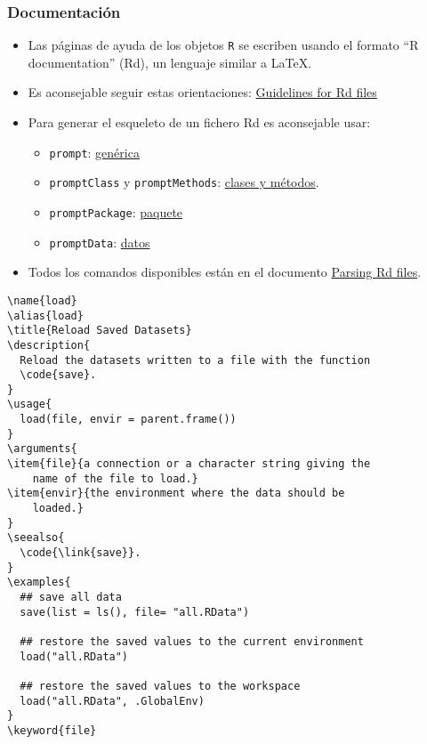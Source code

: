 \documentclass[xcolor={usenames,svgnames,dvipsnames}]{beamer}
\begin{document}
\begin{frame}
\frametitle{Documentación}
\label{sec-2-7}

\begin{itemize}
\item Las páginas de ayuda de los objetos \texttt{R} se escriben usando el
  formato “R documentation” (Rd), un lenguaje similar a \LaTeX{}.
\item Es aconsejable seguir estas orientaciones: \href{http://developer.r-project.org/Rds.html}{Guidelines for Rd files}
\item Para generar el esqueleto de un fichero Rd es aconsejable usar:
\begin{itemize}
\item \texttt{prompt}: \href{http://cran.r-project.org/doc/manuals/r-release/R-exts.html\#Documenting-functions}{genérica}
\item \texttt{promptClass} y \texttt{promptMethods}: \href{http://cran.r-project.org/doc/manuals/r-release/R-exts.html\#Documenting-S4-classes-and-methods}{clases y métodos}.
\item \texttt{promptPackage}: \href{http://cran.r-project.org/doc/manuals/r-release/R-exts.html\#Documenting-packages}{paquete}
\item \texttt{promptData}: \href{http://cran.r-project.org/doc/manuals/r-release/R-exts.html\#Documenting-data-sets}{datos}
\end{itemize}
\item Todos los comandos disponibles están en el documento \href{http://developer.r-project.org/parseRd.pdf}{Parsing Rd files}.
\end{itemize}
\end{frame}
\begin{frame}[fragile]


\begin{verbatim}
\name{load}
\alias{load}
\title{Reload Saved Datasets}
\description{
  Reload the datasets written to a file with the function
  \code{save}.
}
\usage{
  load(file, envir = parent.frame())
}
\arguments{
\item{file}{a connection or a character string giving the
    name of the file to load.}
\item{envir}{the environment where the data should be
    loaded.}
}
\seealso{
  \code{\link{save}}.
}
\examples{
  ## save all data
  save(list = ls(), file= "all.RData")
  
  ## restore the saved values to the current environment
  load("all.RData")
  
  ## restore the saved values to the workspace
  load("all.RData", .GlobalEnv)
}
\keyword{file}
\end{verbatim}
\end{frame}
\end{document}
